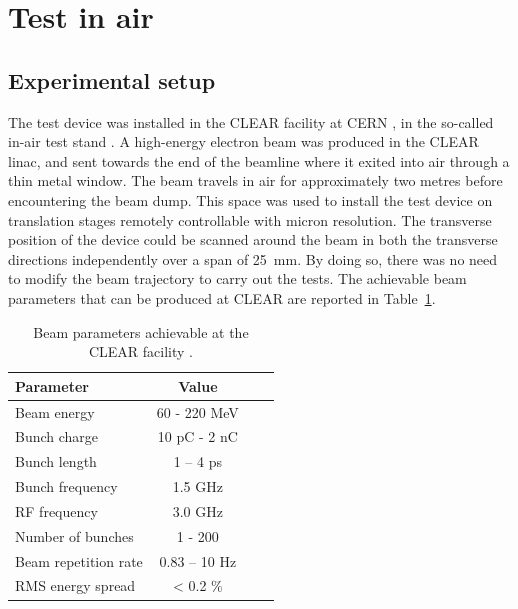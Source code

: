 \section[Test in air]{Test in air}\label{sec:test-in-air}

\subsection[Experimental setup]{Experimental setup}\label{sec:setup}

The test device was installed in the CLEAR facility at CERN \cite{Sjobak:2019may}, in the so-called in-air test stand \cite{Corsini:IPAC2018-THPMF014}. A high-energy electron beam was produced in the CLEAR linac, and sent towards the end of the beamline where it exited into air through a thin metal window. The beam travels in air for approximately two metres before encountering the beam dump. This space was used to install the test device on translation stages remotely controllable with micron resolution. The transverse position of the device could be scanned around the beam in both the transverse directions independently over a span of 25~mm. By doing so, there was no need to modify the beam trajectory to carry out the tests. The achievable beam parameters that can be produced at CLEAR are reported in Table~\ref{tab:CLEAR_param}.

\begin{table}[b]
  \centering
    \begin{tabular}{l c c c}
    \toprule
    Parameter & Value \\
    \midrule
    Beam energy & 60 - 220 MeV\\
    Bunch charge & 10 pC - 2 nC\\
    Bunch length &1 – 4 ps\\
    Bunch frequency & 1.5 GHz\\
    RF frequency & 3.0 GHz\\
    Number of bunches & 1 - 200 \\
    Beam repetition rate & 0.83 – 10 Hz\\
    RMS energy spread & < 0.2 \% \\
    \bottomrule
    \end{tabular}
  \caption{Beam parameters achievable at the CLEAR facility \cite{Sjobak:2019may}.} \label{tab:CLEAR_param}
\end{table}

